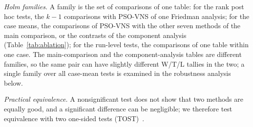 \emph{Holm families.} A family is the set of comparisons of one table: for the rank post hoc tests, the $k-1$ comparisons with PSO-VNS of one Friedman analysis; for the case means, the comparisons of PSO-VNS with the other seven methods of the main comparison, or the \NAblNContrasts{} contrasts of the component analysis (Table~\ref{tab:ablation}); for the run-level tests, the comparisons of one table within one case. The main-comparison and the component-analysis tables are different families, so the same pair can have slightly different W/T/L tallies in the two; a single family over all \NXMultN{} case-mean tests is examined in the robustness analysis below.

\emph{Practical equivalence.} A nonsignificant test does not show that two methods are equally good, and a significant difference can be negligible; we therefore test equivalence with two one-sided tests (TOST)~\cite{Lakens2017}.


